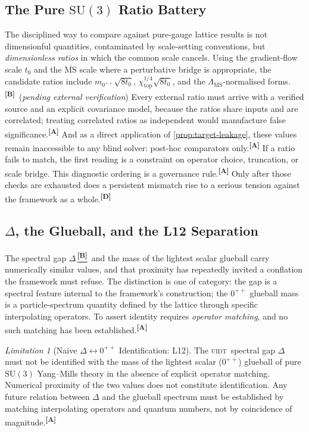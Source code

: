 \documentclass[12pt,a4paper,twoside]{article}
\theoremstyle{plain}
\theoremstyle{definition}
\theoremstyle{remark}
\newtheorem{limitation}[theorem]{Limitation}
\newcommand{\UIDT}{\textsc{uidt}}
\newcommand{\catmark}[1]{\textsuperscript{\textsf{\textbf{[#1]}}}}
\newcommand{\Bdelta}{\hyperref[box:pi-override-delta]{\catmark{B}}}
\begin{document}
\subsection{The Pure \texorpdfstring{$\mathrm{SU}(3)$}{SU(3)} Ratio Battery}
\label{subsec:ratio-battery}

The disciplined way to compare against pure-gauge lattice results is not
dimensionful quantities, contaminated by scale-setting conventions, but
\emph{dimensionless ratios} in which the common scale cancels. Using the
gradient-flow scale $t_0$ and the $\overline{\mathrm{MS}}$ scale where a
perturbative bridge is appropriate, the candidate ratios include
$m_{0^{++}}\sqrt{8t_0}$, $\chi_{\mathrm{top}}^{1/4}\sqrt{8t_0}$, and the
$\Lambda_{\overline{\mathrm{MS}}}$-normalised forms.\catmark{B}\ (\emph{pending external verification})
Every external ratio must arrive with a verified source and an explicit
covariance model, because the ratios share inputs and are correlated;
treating correlated ratios as independent would manufacture false
significance.\catmark{A} And as a direct application of
\cref{prop:target-leakage}, these values remain inaccessible to any
blind solver: post-hoc comparators only.\catmark{A} If a ratio fails to
match, the first reading is a constraint on operator choice, truncation,
or scale bridge. This diagnostic ordering is a governance rule.\catmark{A}
Only after those checks are exhausted does a persistent mismatch rise to a
serious tension against the framework as a whole.\catmark{D}

\subsection{\texorpdfstring{$\Delta$}{Delta}, the Glueball, and the L12 Separation}
\label{subsec:delta-glueball-l12}

The spectral gap $\Delta$\,\Bdelta\ and the mass of the lightest scalar
glueball carry numerically similar values, and that proximity has
repeatedly invited a conflation the framework must refuse. The
distinction is one of category: the gap is a spectral feature internal
to the framework's construction; the $0^{++}$ glueball mass is a
particle-spectrum quantity defined by the lattice through specific
interpolating operators. To assert identity requires \emph{operator
matching}, and no such matching has been established.\catmark{A}

\begin{limitation}[Naive $\Delta\!\leftrightarrow\!0^{++}$ Identification: L12]
\label{lim:L12}
The \UIDT\ spectral gap $\Delta$ must not be identified with the mass of
the lightest scalar ($0^{++}$) glueball of pure $\mathrm{SU}(3)$
Yang--Mills theory in the absence of explicit operator matching.
Numerical proximity of the two values does not constitute
identification. Any future relation between $\Delta$ and the glueball
spectrum must be established by matching interpolating operators and
quantum numbers, not by coincidence of magnitude.\catmark{A}
\end{limitation}
\end{document}

